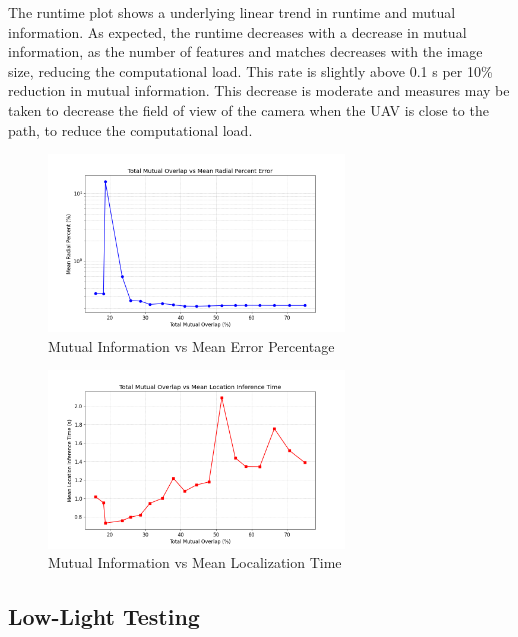 The runtime plot shows a underlying linear trend in runtime and mutual information. As expected, the runtime decreases with a decrease in mutual information, as the number of features and matches decreases with the image size, reducing the computational load. This rate is slightly above 0.1 s per 10\% reduction in mutual information. This decrease is moderate and measures may be taken to decrease the field of view of the camera when the UAV is close to the path, to reduce the computational load.


\begin{figure}
    \centering
    \includegraphics[width=0.7\textwidth]{Chapter 5/RESULTPLOTS/MUTUAL_ACC.png}
    \caption{Mutual Information vs Mean Error Percentage}
    \label{fig:Mutual_Information_ACC}
\end{figure}

\begin{figure}[H]
    \centering
    \includegraphics[width=0.7\textwidth]{Chapter 5/RESULTPLOTS/MUTUAL_TIME.png}
    \caption{Mutual Information vs Mean Localization Time}
    \label{fig:Mutual_Information_Time}
\end{figure}



\subsection{Low-Light Testing}

